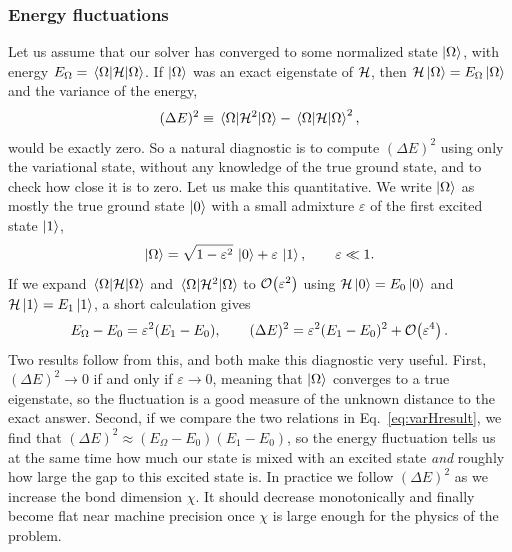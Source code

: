 \documentclass[lecture_notes.tex]{subfiles}
\begin{document}
\subsubsection{Energy fluctuations}
Let us assume that our solver has converged to some normalized state $\ket{\Omega}$, with energy
$E_\Omega = \expval{\mathcal{H}}{\Omega}$. If $\ket{\Omega}$ was an exact eigenstate of $\mathcal{H}$, then
$\mathcal{H}\ket{\Omega} = E_\Omega\ket{\Omega}$ and the variance of the energy,
\begin{equation}
  (\Delta E)^2 \equiv \expval{\mathcal{H}^2}{\Omega} - \expval{\mathcal{H}}{\Omega}^2,
  \label{eq:varH}
\end{equation}
would be exactly zero. So a natural diagnostic is to compute $(\Delta E)^2$ using only the
variational state, without any knowledge of the true ground state, and to check how close it is
to zero. Let us make this quantitative. We write $\ket{\Omega}$ as mostly the true ground state
$\ket{0}$ with a small admixture $\varepsilon$ of the first excited state $\ket{1}$,
\begin{equation}
  \ket{\Omega} = \sqrt{1-\varepsilon^2}\,\ket{0} + \varepsilon\,\ket{1}, \qquad \varepsilon\ll 1.
\end{equation}
If we expand $\expval{\mathcal{H}}{\Omega}$ and $\expval{\mathcal{H}^2}{\Omega}$ to $\mathcal{O}\!\left(\varepsilon^2\right)$
using $\mathcal{H}\ket{0}=E_0\ket{0}$ and $\mathcal{H}\ket{1}=E_1\ket{1}$, a short calculation gives
\begin{equation}
  E_\Omega - E_0 = \varepsilon^2(E_1-E_0), \qquad
  (\Delta E)^2 = \varepsilon^2(E_1-E_0)^2 + \mathcal{O}\!\left(\varepsilon^4\right).
  \label{eq:varHresult}
\end{equation}
Two results follow from this, and both make this diagnostic very useful. First,
$(\Delta E)^2 \to 0$ if and only if $\varepsilon\to 0$, meaning that $\ket{\Omega}$ converges to a
true eigenstate, so the fluctuation is a good measure of the unknown distance to the exact answer.
Second, if we compare the two relations in Eq.~\eqref{eq:varHresult}, we find that
$(\Delta E)^2 \approx (E_\Omega - E_0)(E_1-E_0)$, so the energy fluctuation tells us at the same
time how much our state is mixed with an excited state \emph{and} roughly how large the gap to
this excited state is. In practice we follow $(\Delta E)^2$ as we increase the bond dimension
$\chi$. It should decrease monotonically and finally become flat near machine precision once
$\chi$ is large enough for the physics of the problem.
\end{document}
